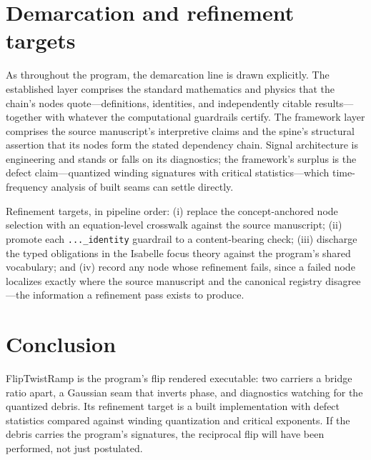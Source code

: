 \documentclass[11pt]{article}
\theoremstyle{remark}
\begin{document}
\section{Demarcation and refinement targets}
\label{sec:demarc}

As throughout the program, the demarcation line is drawn explicitly. The established layer comprises the standard mathematics and physics that the chain's nodes quote---definitions, identities, and independently citable results---together with whatever the computational guardrails certify. The framework layer comprises the source manuscript's interpretive claims and the spine's structural assertion that its nodes form the stated dependency chain. Signal architecture is engineering and stands or falls on its diagnostics; the framework's surplus is the defect claim---quantized winding signatures with critical statistics---which time-frequency analysis of built seams can settle directly.

Refinement targets, in pipeline order: (i) replace the concept-anchored node selection with an equation-level crosswalk against the source manuscript; (ii) promote each \texttt{...\_identity} guardrail to a content-bearing check; (iii) discharge the typed obligations in the Isabelle focus theory against the program's shared vocabulary; and (iv) record any node whose refinement fails, since a failed node localizes exactly where the source manuscript and the canonical registry disagree---the information a refinement pass exists to produce.

\section{Conclusion}
\label{sec:conc}

FlipTwistRamp is the program's flip rendered executable: two carriers a bridge ratio apart, a Gaussian seam that inverts phase, and diagnostics watching for the quantized debris. Its refinement target is a built implementation with defect statistics compared against winding quantization and critical exponents. If the debris carries the program's signatures, the reciprocal flip will have been performed, not just postulated.
\end{document}
